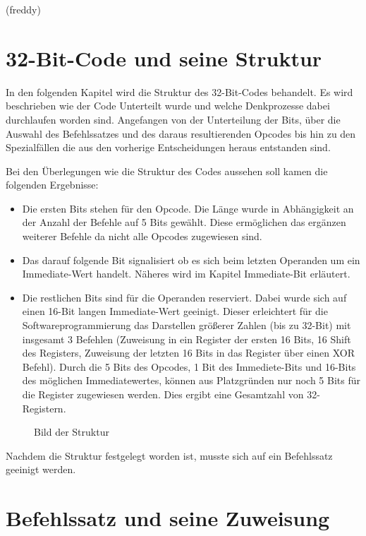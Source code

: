 \documentclass[paper=a4,fontsize=12pt,twocolumn]{scrreprt}
\begin{document}
(freddy)

\section{ 32-Bit-Code und seine Struktur}

In den folgenden Kapitel wird die Struktur des 32-Bit-Codes behandelt.
Es wird beschrieben wie der Code Unterteilt wurde und welche Denkprozesse dabei durchlaufen worden sind.
Angefangen von der Unterteilung der Bits, über die Auswahl des Befehlssatzes und des daraus resultierenden Opcodes bis hin zu den Spezialfällen die aus den vorherige Entscheidungen heraus entstanden sind.

Bei den Überlegungen wie die Struktur des Codes aussehen soll kamen die folgenden Ergebnisse: 
\begin{itemize}
    \item Die ersten Bits stehen für den Opcode.
    Die Länge wurde in Abhängigkeit an der Anzahl der Befehle auf 5 Bits gewählt.
    Diese ermöglichen das ergänzen weiterer Befehle da nicht alle Opcodes zugewiesen sind. 
    \item Das darauf folgende Bit signalisiert ob es sich beim letzten Operanden um ein Immediate-Wert handelt.
    Näheres wird im Kapitel Immediate-Bit erläutert.
    \item Die restlichen Bits sind für die Operanden reserviert.
    Dabei wurde sich auf einen 16-Bit langen Immediate-Wert geeinigt.
    Dieser erleichtert für die  Softwareprogrammierung das Darstellen größerer Zahlen (bis zu 32-Bit) mit insgesamt 3 Befehlen (Zuweisung in ein Register der ersten 16 Bits, 16 Shift des Registers, Zuweisung der letzten 16 Bits in das Register über einen XOR Befehl).
    Durch die 5 Bits des Opcodes, 1 Bit des Immediete-Bits und 16-Bits des möglichen Immediatewertes, können aus Platzgründen nur noch 5 Bits für die Register zugewiesen werden.
    Dies ergibt eine Gesamtzahl von 32-Registern.
\end{itemize}

\begin{figure}[h]
\centering
\caption{Bild der Struktur}
\end{figure}

Nachdem die Struktur festgelegt worden ist, musste sich auf ein Befehlssatz geeinigt werden.

\section{Befehlssatz und seine Zuweisung}
\end{document}
